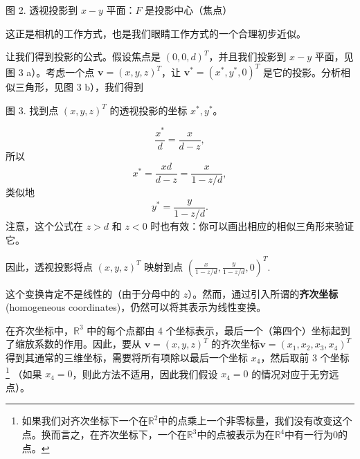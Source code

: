 
图 2. 透视投影到 $x-y$ 平面：$F$ 是投影中心（焦点）

这正是相机的工作方式，也是我们眼睛工作方式的一个合理初步近似。

让我们得到投影的公式。假设焦点是 $(0, 0, d)^T$，并且我们投影到 $x-y$ 平面，见图 3 a）。考虑一个点 $\mathbf{v} = (x, y, z)^T$，让 $\mathbf{v}^* = (x^*, y^*, 0)^T$ 是它的投影。分析相似三角形，见图 3 b），我们得到


图 3. 找到点 $(x, y, z)^T$ 的透视投影的坐标 $x^*, y^*$。

$$\frac{x^*}{d} = \frac{x}{d-z},$$
所以 
$$x^* = \frac{xd}{d-z} = \frac{x}{1 - z/d},$$
类似地 
$$y^* = \frac{y}{1 - z/d}.$$
注意，这个公式在 $z > d$ 和 $z < 0$ 时也有效：你可以画出相应的相似三角形来验证它。


因此，透视投影将点 $(x, y, z)^T$ 映射到点 $(\frac{x}{1-z/d}, \frac{y}{1-z/d}, 0)^T.$

这个变换肯定不是线性的（由于分母中的 $z$）。然而，通过引入所谓的\textbf{齐次坐标}(homogeneous coordinates)，仍然可以将其表示为线性变换。

在齐次坐标中，$\mathbb{R}^3$ 中的每个点都由 4 个坐标表示，最后一个（第四个）坐标起到了缩放系数的作用。因此，要从 $\mathbf{v} = (x, y, z)^T$ 的齐次坐标$\mathbf{v} = (x_1, x_2, x_3, x_4) ^T$得到其通常的三维坐标，需要将所有项除以最后一个坐标 $x_4$，然后取前 3 个坐标
\footnote{
如果我们对齐次坐标下一个在$\mathbb{R}^2$中的点乘上一个非零标量，我们没有改变这个点。换而言之，在齐次坐标下，一个在$\mathbb{R}^3$中的点被表示为在$\mathbb{R}^4$中有一行为0的点。
}
（如果 $x_4 = 0$，则此方法不适用，因此我们假设 $x_4 = 0$ 的情况对应于无穷远点）。

